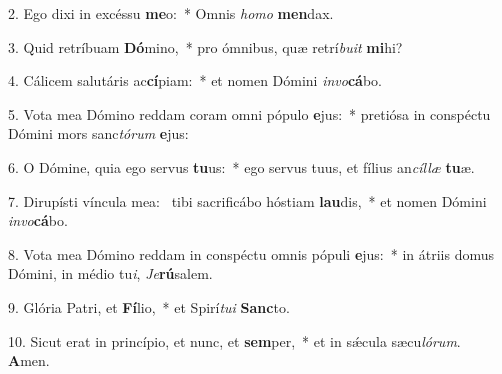 2. Ego dixi in excéssu \textbf{me}o:~*  Omnis \textit{ho}\textit{mo} \textbf{men}dax.\

3. Quid retríbuam \textbf{Dó}mino,~*  pro ómnibus, quæ retrí\textit{bu}\textit{it} \textbf{mi}hi?\

4. Cálicem salutáris ac\textbf{cí}piam:~*  et nomen Dómini \textit{in}\textit{vo}\textbf{cá}bo.\

5. Vota mea Dómino reddam coram omni pópulo \textbf{e}jus:~*  pretiósa in conspéctu Dómini mors sanc\textit{tó}\textit{rum} \textbf{e}jus:\

6. O Dómine, quia ego servus \textbf{tu}us:~*  ego servus tuus, et fílius an\textit{cíl}\textit{læ} \textbf{tu}æ.\

7. Dirupísti víncula mea: \dag\  tibi sacrificábo hóstiam \textbf{lau}dis,~*  et nomen Dómini \textit{in}\textit{vo}\textbf{cá}bo.\

8. Vota mea Dómino reddam in conspéctu omnis pópuli \textbf{e}jus:~*  in átriis domus Dómini, in médio tu\textit{i}, \textit{Je}\textbf{rú}salem.\

9. Glória Patri, et \textbf{Fí}lio,~*  et Spirí\textit{tu}\textit{i} \textbf{Sanc}to.\

10. Sicut erat in princípio, et nunc, et \textbf{sem}per,~*  et in sǽcula sæcu\textit{ló}\textit{rum}. \textbf{A}men.\


